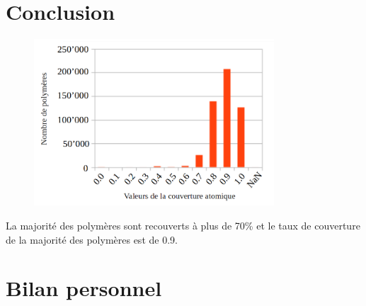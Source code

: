 \documentclass[11pt, a4paper]{report}
\begin{document}
	
	\chapter*{Conclusion}
	
	\begin{figure}[H]
		\includegraphics[width=0.8\textwidth]{./images/ACs2m.png}
	\end{figure}
	La majorité des polymères sont recouverts à plus de 70\% et le taux de couverture de la majorité des polymères est de 0.9.
	
	
	\chapter*{Bilan personnel}
	
	
\end{document}
